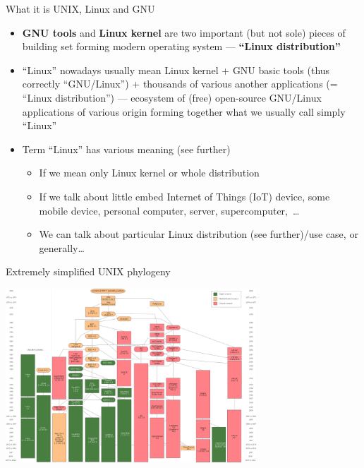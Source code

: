 \documentclass[compress, xelatex, 11pt, xcolor=svgnames, aspectratio=169,
	hyperref={
		bookmarks=true,
		unicode=true,
		colorlinks=true,
		pdftitle={Linux, command line and MetaCentrum},
		plainpages=false,
		pdfauthor={Vojtech Zeisek},
		pdfsubject={Course about use of Linux command line, writing shell scripts and using MetaCentrum of CESNET},
		pdfcreator={XeLaTeX},
		pdfkeywords={Linux, GNU, BASH, shell, command line, MetaCentrum},
		linkcolor=DarkRed, %
		anchorcolor=DarkBlue, %
		citecolor=Indigo, %
		filecolor=NavyBlue, %
		menucolor=DarkMagenta, %
		urlcolor=DarkBlue, %
		},
	url={hyphens, lowtilde} %
	]{beamer}
\begin{document}
\begin{frame}[allowframebreaks]{What it is UNIX, Linux and GNU}
\begin{itemize}
		\item \textbf{GNU tools} and \textbf{Linux kernel} are two important (but not sole) pieces of building set forming modern operating system --- \textbf{\enquote{Linux distribution}}
		\item \enquote{Linux} nowadays usually mean Linux kernel + GNU basic tools (thus correctly \enquote{GNU/Linux}) + thousands of various another applications (= \enquote{Linux distribution}) --- ecosystem of (free) open-source GNU/Linux applications of various origin forming together what  we usually call simply \enquote{Linux}
		\item Term \enquote{Linux} has various meaning (see further)
		\begin{itemize}
			\item If we mean only Linux kernel or whole distribution
			\item If we talk about little embed Internet of Things (IoT) device, some mobile device, personal computer, server, supercomputer,~\ldots
			\item We can talk about particular Linux distribution (see further)/use case, or generally\ldots
		\end{itemize}
	\end{itemize}
\end{frame}

\begin{frame}{Extremely simplified UNIX phylogeny}
	\begin{center}
		\includegraphics[height=6.5cm]{unix_history-simple.png}
	\end{center}
\end{frame}
\end{document}
